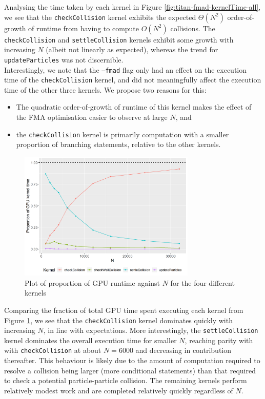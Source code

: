 \documentclass[12pt]{article}
\begin{document}
Analysing the time taken by each kernel in Figure \ref{fig:titan-fmad-kernelTime-all}, we see that the \texttt{checkCollision} kernel exhibits the expected $\Theta(N^2)$ order-of-growth of runtime from having to compute $O(N^2)$ collisions. The \texttt{checkCollision} and \texttt{settleCollision} kernels exhibit some growth with increasing $N$ (albeit not linearly as expected), whereas the trend for \texttt{updateParticles} was not discernible. \\

Interestingly, we note that the \texttt{--fmad} flag only had an effect on the execution time of the \texttt{checkCollision} kernel, and did not meaningfully affect the execution time of the other three kernels. We propose two reasons for this:
\begin{itemize}
    \item The quadratic order-of-growth of runtime of this kernel makes the effect of the FMA optimisation easier to observe at large $N$, and
    \item the \texttt{checkCollision} kernel is primarily computation with a smaller proportion of branching statements, relative to the other kernels.
\end{itemize}

\begin{figure}[H]
    \centering
    \includegraphics[width=0.75\textwidth]{titan-fmad-proportion-GPU}
    \caption{Plot of proportion of GPU runtime against $N$ for the four different kernels}
    \label{fig:titan-fmad-proportion-GPU}
\end{figure}

Comparing the fraction of total GPU time spent executing each kernel from Figure \ref{fig:titan-fmad-proportion-GPU}, we see that the \texttt{checkCollision} kernel dominates quickly with increasing $N$, in line with expectations. More interestingly, the \texttt{settleCollision} kernel dominates the overall execution time for smaller $N$, reaching parity with with \texttt{checkCollision} at about $N = 6000$ and decreasing in contribution thereafter. This behaviour is likely due to the amount of computation required to resolve a collision being larger (more conditional statements) than that required to check a potential particle-particle collision. The remaining kernels perform relatively modest work and are completed relatively quickly regardless of $N$.\\
\end{document}
